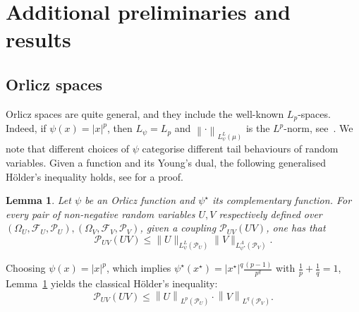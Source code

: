 \documentclass[11pt]{article}
\newcommand{\Pm}{\mathcal{P}}
\newcommand{\F}{\mathcal{F}}
\theoremstyle{plain}
\newtheorem{lemma}[theorem]{Lemma}
\theoremstyle{remark}
\newtheorem{example}{Example}
\begin{document}



\newpage

\appendix
{}
\section{Additional preliminaries and results}
\subsection{Orlicz spaces} \label{app:orliczSpaces}
Orlicz spaces are quite general, and they include the well-known $L_p$-spaces. Indeed, if $\psi(x)= |x|^p$, then $L_\psi = L_p$ and $\left\lVert\cdot\right\rVert_{L^L_\psi(\mu)}$ is the $L^p$-norm, see~.
We note that different choices of $\psi$ categorise different tail behaviours of random variables. 
Given a function and its %
Young's dual, the following  generalised H\"older's inequality holds, see \cite[Appendix A]{fullVersionGeneralization} for a proof.
\begin{lemma}\label{thm:generalisedHolder}
Let $\psi$ be an Orlicz function and $\psi^\star$ %
its complementary function. For every pair of non-negative random variables $U,V$ respectively defined over $(\Omega_U,\F_U,\Pm_U),(\Omega_V,\F_V,\Pm_V)$, given a coupling  $\Pm_{UV}(UV)$, one has that
    \begin{equation}\label{eq:genHoldIneq}
        \Pm_{UV}(UV) \leq \lVert U\rVert_{L^L_\psi(\Pm_U)} \lVert V\rVert_{L^A_{\psi^\star}(\Pm_V)}.
    \end{equation}
\end{lemma}
Choosing $\psi(x)=|x|^p$, which implies ${\psi}^\star(x^\star)=|x^\star|^q\frac{(p-1)}{p^q}$ with $\frac1p+\frac1q=1$, Lemma~\ref{thm:generalisedHolder} yields the classical H\"older's inequality:
    \begin{equation}
    \Pm_{UV}(UV) \leq \left\lVert U\right\rVert_{L^p(\Pm_U)} \cdot \left\lVert V\right\rVert_{L^q(\Pm_V)}.
    \end{equation}
\end{document}
